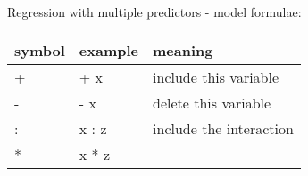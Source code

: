 \documentclass[
  ignorenonframetext,
]{beamer}
\begin{document}
\begin{frame}{Regression with multiple predictors - model formulae:}
\protect\hypertarget{regression-with-multiple-predictors---model-formulae}{}

\begin{longtable}[]{@{}lll@{}}
\toprule
\begin{minipage}[b]{0.14\columnwidth}\raggedright
symbol\strut
\end{minipage} & \begin{minipage}[b]{0.24\columnwidth}\raggedright
example\strut
\end{minipage} & \begin{minipage}[b]{0.53\columnwidth}\raggedright
meaning\strut
\end{minipage}\tabularnewline
\midrule
\endhead
\begin{minipage}[t]{0.14\columnwidth}\raggedright
+\strut
\end{minipage} & \begin{minipage}[t]{0.24\columnwidth}\raggedright
+ x\strut
\end{minipage} & \begin{minipage}[t]{0.53\columnwidth}\raggedright
include this variable\strut
\end{minipage}\tabularnewline
\begin{minipage}[t]{0.14\columnwidth}\raggedright
-\strut
\end{minipage} & \begin{minipage}[t]{0.24\columnwidth}\raggedright
- x\strut
\end{minipage} & \begin{minipage}[t]{0.53\columnwidth}\raggedright
delete this variable\strut
\end{minipage}\tabularnewline
\begin{minipage}[t]{0.14\columnwidth}\raggedright
:\strut
\end{minipage} & \begin{minipage}[t]{0.24\columnwidth}\raggedright
x : z\strut
\end{minipage} & \begin{minipage}[t]{0.53\columnwidth}\raggedright
include the interaction\strut
\end{minipage}\tabularnewline
\begin{minipage}[t]{0.14\columnwidth}\raggedright
*\strut
\end{minipage} & \begin{minipage}[t]{0.24\columnwidth}\raggedright
x * z\strut
\end{minipage} & \begin{minipage}[t]{0.53\columnwidth}\raggedright

\end{minipage}
\end{longtable}
\end{frame}
\end{document}
